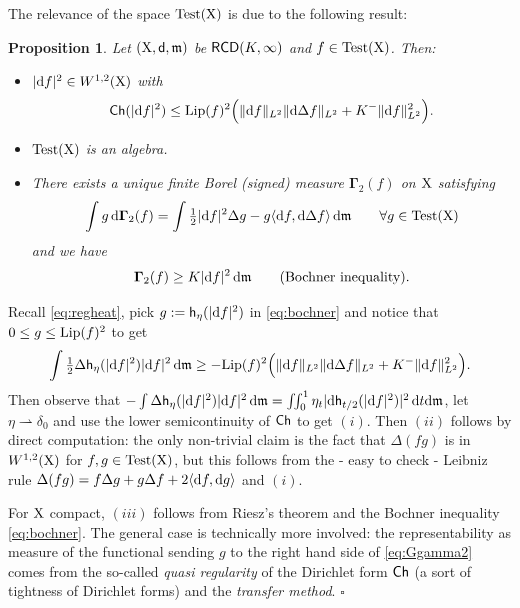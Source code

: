 \documentclass[11pt]{article}
\numberwithin{equation}{section}
\newtheorem{proposition}[theorem]{Proposition}
\newenvironment{idea}{\removelastskip\par\medskip   %
\noindent{\em Idea of the proof} \rm}{\penalty-20\null\hfill$\square$\par\medbreak}
\newcommand{\X}{{\rm X}}
\newcommand{\sfd}{{\sf d}}
\newcommand{\mm}{{\mathfrak m}}
\newcommand{\RCD}{{\sf RCD}}
\newcommand{\ch}{{\sf Ch}}
\renewcommand{\d}{{\rm d}}
\newcommand{\Lip}{{\rm Lip}}
\newcommand{\weakto}{\rightharpoonup}
\newcommand{\h}{{\sf h}} %
\newcommand\la{\langle}
\newcommand\ra{\rangle}
\newcommand{\test}{{\rm Test}}
\newcommand{\Ggamma}{{\mathbf \Gamma}}
\begin{document}
The relevance of the space $\test(\X)$ is due to the following result:
\begin{proposition}\label{prop:test} Let $(\X,\sfd,\mm)$ be $\RCD(K,\infty)$ and $f\in \test(\X)$. Then:
\begin{itemize}
\item[i)] $|\d f|^2\in W^{1,2}(\X)$ with
\begin{equation}
\label{eq:ddf}
\ch(|\d f|^2)\leq \Lip(f)^2\Big( \|\d f\|_{L^2}\|\d\Delta f\|_{L^2}+K^-\|\d f\|^2_{L^2}\Big).
\end{equation}
\item[ii)] $\test(\X)$ is an algebra.
\item[iii)] There exists a unique finite Borel (signed) measure $\Ggamma_2(f)$ on $\X$ satisfying
\begin{equation}
\label{eq:Ggamma2}
\int g\,\d\Ggamma_2(f)=\int \tfrac12{|\d f|^2}\Delta g-g\la \d f,\d\Delta f \ra\,\d\mm\qquad\forall g\in \test(\X)
\end{equation}
and we have
\begin{equation}
\label{eq:BG2}
\Ggamma_2(f)\geq K|\d f|^2\,\d\mm\qquad\text{(Bochner inequality)}.
\end{equation}
\end{itemize} 
\end{proposition}
\begin{idea}
Recall \eqref{eq:regheat}, pick $g:=\h_\eta(|\d f|^2)$ in \eqref{eq:bochner} and notice that $0\leq g\leq \Lip(f)^2$ to get
\[
\int \tfrac12\Delta \h_\eta(|\d f|^2) |\d f|^2\,\d\mm\geq -\Lip(f)^2\Big( \|\d f\|_{L^2}\|\d\Delta f\|_{L^2}+K^-\|\d f\|^2_{L^2}\Big).
\]
Then observe that $-\int \Delta \h_\eta(|\d f|^2) |\d f|^2\,\d\mm=\iint_0^1\eta_t | \d\h_{t/2}(|\d f|^2)|^2\,\d t\d\mm$, let $\eta\weakto \delta_0$ and use the lower semicontinuity of $\ch$ to get $(i)$. Then $(ii)$ follows by direct computation: the only non-trivial claim is the fact that $\Delta(fg)$ is in $W^{1,2}(\X)$ for $f,g\in\test(\X)$, but this follows from the - easy to check - Leibniz rule $\Delta(fg)=f\Delta g+g\Delta f+2\la\d f,\d g\ra$ and $(i)$.

For $\X$  compact,  $(iii)$ follows from  Riesz's theorem and the Bochner inequality \eqref{eq:bochner}. The general case is technically more involved: the representability as measure of the functional sending $g$ to the right hand side of \eqref{eq:Ggamma2} comes from the so-called \emph{quasi regularity} of the Dirichlet form $\ch$ (a sort of tightness of Dirichlet forms) and the  \emph{transfer method}.
\end{idea}
\end{document}
